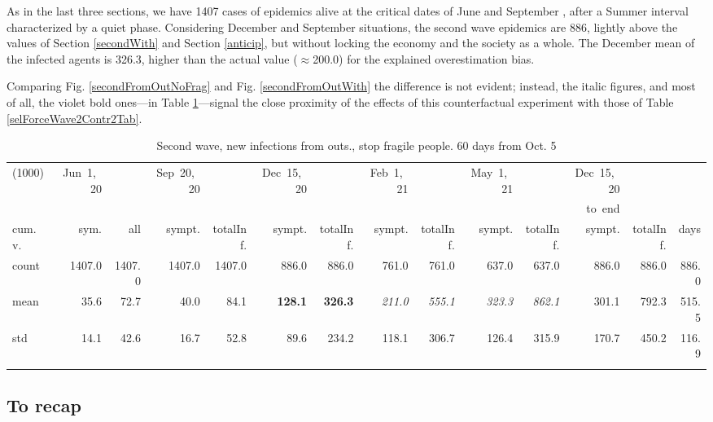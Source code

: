 \documentclass[graybox]{svmult}
\begin{document}
As in the last three sections, we have 1407 cases of epidemics alive at the critical dates of June  and September , after a Summer interval characterized by a quiet phase.
Considering December  and September  situations, the second wave epidemics are 886, lightly above the values of Section \ref{secondWith} and Section \ref{anticip}, but without locking the economy and the society as a whole. The December mean of the infected agents is 326.3, higher than the actual value ($\approx$200.0) for the explained overestimation bias.

Comparing Fig. \ref{secondFromOutNoFrag} and Fig. \ref{secondFromOutWith} the difference is not evident; instead, the italic figures, and most of all, the violet bold ones---in Table \ref{selForceWave2NoFragTab}---signal the close proximity of the effects of this counterfactual experiment with those of Table \ref{selForceWave2Contr2Tab}.


\begin{table}[t]
\center
\tiny
\begin{tabular}{lrrrrrrrrrrrrr}
\hline\noalign{\smallskip}
(1000) & Jun~1,~20 & & Sep~20,~20 & & Dec~15,~20 & & Feb~1,~21 & & May~1,~21 & & Dec~15,~20 \\
& & & & & & & & & & & to~end \\
cum.~v. & sym. & all & sympt. & totalInf. & sympt. & totalInf. & sympt. & totalInf. & sympt. & totalInf. & sympt. & totalInf. & days\\
\noalign{\smallskip}\svhline\noalign{\smallskip}
count & 1407.0 & 1407.0 & 1407.0 & 1407.0 & 886.0 & 886.0 & 761.0 & 761.0 & 637.0 & 637.0 & 886.0 & 886.0 & 886.0 \\
mean & 35.6 & 72.7 & 40.0 & 84.1 & \textbf{{\color{violet}128.1}} & \textbf{{\color{violet}326.3}} & \emph{211.0} & \emph{555.1} & \emph{323.3} & \emph{862.1} & 301.1 & 792.3 & 515.5 \\
std & 14.1 & 42.6 & 16.7 & 52.8 & 89.6 & 234.2 & 118.1 & 306.7 & 126.4 & 315.9 & 170.7 & 450.2 & 116.9 \\
\hline\noalign{\smallskip}
\end{tabular}
\caption{Second wave, new infections from outs., stop fragile people. 60 days from Oct. 5}
\label{selForceWave2NoFragTab}
\end{table}


\subsection{To recap}
\label{recap}
\end{document}

